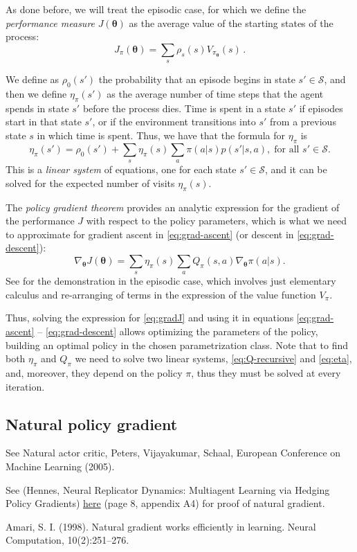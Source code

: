 As done before, we will treat the episodic case, for which we define the \emph{performance measure} $J(\boldsymbol \theta)$ as the average value of the starting states of the process:
\begin{equation}
    J_\pi (\boldsymbol \theta) = \sum_s \rho_s(s) V_{\pi_{\boldsymbol \theta}}(s) \, .
\end{equation}

We define as $\rho_0(s')$ the probability that an episode begins in state $s' \in \mathcal S$, and then we define $\eta_\pi(s')$ as the average number of time steps that the agent spends in state $s'$ before the process dies. Time is spent in a state $s'$ if episodes start in that state $s'$, or if the environment transitions into $s'$ from a previous state $s$ in which time is spent. Thus, we have that the formula for $\eta_\pi$ is
\begin{equation}
    \eta_\pi(s') = \rho_0(s') + \sum_s \eta_\pi(s) \sum_a \pi(a|s) p(s'|s, a), \; \text{for all } s' \in \mathcal S.
    \label{eq:eta}
\end{equation}
This is a \textit{linear system} of equations, one for each state $s' \in \mathcal S$, and it can be solved for the expected number of visits $\eta_\pi(s)$.

The \emph{policy gradient theorem} provides an analytic expression for the gradient of the performance $J$ with respect to the policy parameters, which is what we need to approximate for gradient ascent in \eqref{eq:grad-ascent} (or descent in \eqref{eq:grad-descent}):
\begin{equation}
    \nabla_{\boldsymbol \theta} J(\boldsymbol \theta) = \sum_s \eta_\pi(s) \sum_a Q_\pi(s, a) \nabla_{\boldsymbol \theta} \pi(a|s).
    \label{eq:gradJ}
\end{equation}
See \cite{SuttonBarto} for the demonstration in the episodic case, which involves just elementary calculus and re-arranging of terms in the expression of the value function $V_\pi$.

Thus, solving the expression for \eqref{eq:gradJ} and using it in equations \eqref{eq:grad-ascent} -- \eqref{eq:grad-descent} allows optimizing the parameters of the policy, building an optimal policy in the chosen parametrization class. Note that to find both $\eta_\pi$ and $Q_\pi$ we need to solve two linear systems, \eqref{eq:Q-recursive} and \eqref{eq:eta}, and, moreover, they depend on the policy $\pi$, thus they must be solved at every iteration.


\subsection{Natural policy gradient}

See Natural actor critic, Peters, Vijayakumar, Schaal, European Conference on Machine Learning (2005).

See (Hennes, Neural Replicator Dynamics: Multiagent Learning via Hedging Policy Gradients) \href{https://arxiv.org/pdf/1906.00190.pdf}{here} (page 8, appendix A4) for proof of natural gradient.

Amari, S. I. (1998). Natural gradient works efficiently in learning. Neural Computation, 10(2):251–276.